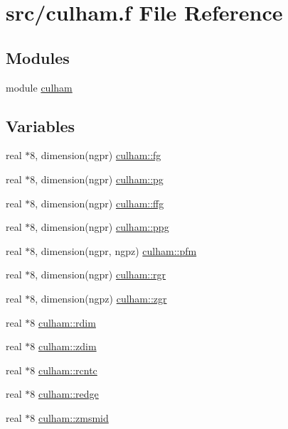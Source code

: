 \hypertarget{culham_8f}{
\section{src/culham.f File Reference}
\label{culham_8f}
}
\subsection*{Modules}
\begin{CompactItemize}
\item 
module \hyperlink{namespaceculham}{culham}
\end{CompactItemize}
\subsection*{Variables}
\begin{CompactItemize}
\item 
real $\ast$8, dimension(ngpr) \hyperlink{namespaceculham_eebfdf9a86b2f50ca0ec4b0df055cd58}{culham::fg}
\item 
real $\ast$8, dimension(ngpr) \hyperlink{namespaceculham_debc8d3361a57d8b688866b6232f731c}{culham::pg}
\item 
real $\ast$8, dimension(ngpr) \hyperlink{namespaceculham_806bc97fe7b18abe6b5946609135d94a}{culham::ffg}
\item 
real $\ast$8, dimension(ngpr) \hyperlink{namespaceculham_395214ac6cbef35696c876fd56b18907}{culham::ppg}
\item 
real $\ast$8, dimension(ngpr, ngpz) \hyperlink{namespaceculham_5d193536b9f85a25d4431dd85c1c4de6}{culham::pfm}
\item 
real $\ast$8, dimension(ngpr) \hyperlink{namespaceculham_2cf8db6042d042662f5152bfd75688e1}{culham::rgr}
\item 
real $\ast$8, dimension(ngpz) \hyperlink{namespaceculham_0fe5d01c9279056fcdb29700ac1642fd}{culham::zgr}
\item 
real $\ast$8 \hyperlink{namespaceculham_ef180524d42fe683c14541e7315e32ef}{culham::rdim}
\item 
real $\ast$8 \hyperlink{namespaceculham_3a2e93e29b6fdb2c74db87ba4970c103}{culham::zdim}
\item 
real $\ast$8 \hyperlink{namespaceculham_24829ee796bd46efe1c8987c323136f4}{culham::rcntc}
\item 
real $\ast$8 \hyperlink{namespaceculham_a03f34fd140fa9f55078c495f874f2f9}{culham::redge}
\item 
real $\ast$8 \hyperlink{namespaceculham_1fb71c104f13bac55811277b4fecdb55}{culham::zmsmid}

\end{CompactItemize}
